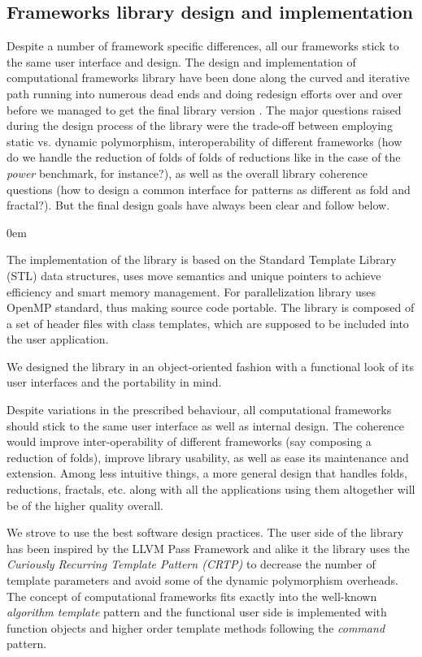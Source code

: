 \subsection{Frameworks library design and implementation}
\label{frameworks_library_design}
\quad Despite a number of framework specific differences, all our frameworks stick to the same user interface and design. The design and implementation of computational frameworks library have been done along the curved and iterative path running into numerous dead ends and doing redesign efforts over and over before we managed to get the final library version \cite{frameworks-repo}. The major questions raised during the design process of the library were the trade-off between employing static vs. dynamic polymorphism, interoperability of different frameworks (how do we handle the reduction of folds of folds of reductions like in the case of the \textit{power} benchmark, for instance?), as well as the overall library coherence questions (how to design a common interface for patterns as different as fold and fractal?). But the final design goals have always been clear and follow below.
\begin{description}[style=unboxed,leftmargin=0cm]
\itemsep0em
\item[Modern C++] The implementation of the library is based on the Standard Template Library (STL) data structures, uses move semantics and unique pointers to achieve efficiency and smart memory management. For parallelization library uses OpenMP standard, thus making source code portable. The library is composed of a set of header files with class templates, which are supposed to be included into the user application.
\item[Convenience] We designed the library in an object-oriented fashion with a functional look of its user interfaces and the portability in mind.
\item[Coherence] Despite variations in the prescribed behaviour, all computational frameworks should stick to the same user interface as well as internal design. The coherence would improve inter-operability of different frameworks (say composing a reduction of folds), improve library usability, as well as ease its maintenance and extension. Among less intuitive things, a more general design that handles folds, reductions, fractals, etc. along with all the applications using them altogether will be of the higher quality overall.
\item[Sound design] We strove to use the best software design practices. The user side of the library has been inspired by the LLVM Pass Framework \cite{llvm-compiler-infrastructure} and alike it the library uses the \textit{Curiously Recurring Template Pattern (CRTP)} to decrease the number of template parameters and avoid some of the dynamic polymorphism overheads. The concept of computational frameworks fits exactly into the well-known \textit{algorithm template} pattern and the functional user side is implemented with function objects and higher order template methods following the \textit{command} pattern.
\end{description}
